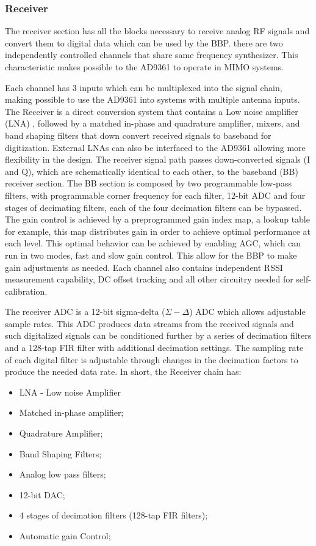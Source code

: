 \subsubsection{Receiver}

The receiver section has all the blocks necessary to receive analog RF signals
and convert them to digital data which can be used by the BBP. there are two
independently controlled channels that share same frequency synthesizer. This
characteristic makes possible to the AD9361 to operate in MIMO systems.

Each channel has 3 inputs which can be multiplexed into the signal chain, making
possible to use the AD9361 into systems with multiple antenna inputs. The
Receiver is a direct conversion system that contains a Low noise amplifier (LNA) ,
followed by a matched in-phase and quadrature amplifier, mixers, and band
shaping filters that down convert received signals to baseband for digitization.
External LNAs can also be interfaced to the AD9361 allowing more flexibility in
the design. The receiver signal path passes down-converted signals (I and Q),
which are schematically identical to each other,  to the baseband (BB) receiver
section. The BB section is composed by two programmable low-pass filters, with
programmable corner frequency for each filter, 12-bit ADC and four stages of
decimating filters, each of the four decimation filters can be bypassed. The
gain control is achieved by a preprogrammed gain index map, a lookup table for
example, this map distributes gain in order to achieve optimal performance at
each level. This optimal behavior can be achieved by enabling AGC, which can run
in two modes, fast and slow gain control. This allow for the BBP to make gain
adjustments as needed. Each channel also contains independent RSSI measurement
capability, DC offset tracking and all other circuitry needed for
self-calibration.

The receiver ADC is a 12-bit sigma-delta ($\Sigma-\Delta$) ADC which allows
adjustable sample rates. This ADC produces data streams from the received
signals and such digitalized signals can be conditioned further by a series of
decimation filters and a 128-tap FIR filter with additional decimation settings.
The sampling rate of each digital filter is adjustable through changes in the
decimation factors to produce the needed data rate.
In short, the Receiver chain has:

\begin{itemize}
	\item LNA - Low noise Amplifier
	\item Matched in-phase amplifier;
	\item Quadrature Amplifier;
	\item Band Shaping Filters;
	\item Analog low pass filters;
	\item 12-bit DAC;
	\item 4 stages of decimation filters (128-tap FIR filters);
	\item Automatic gain Control;
\end{itemize}

